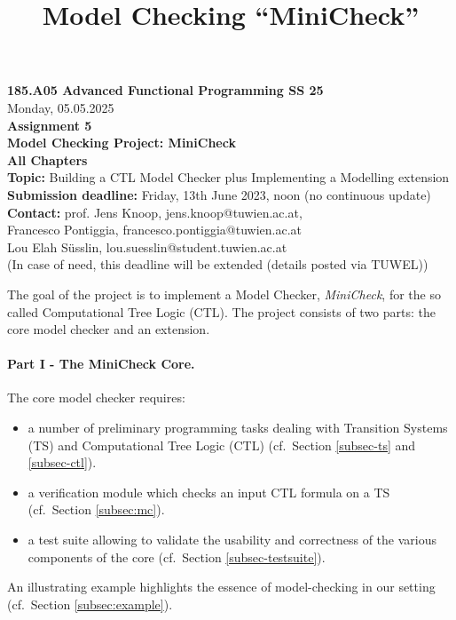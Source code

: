 \documentclass{article}
\title{Model Checking ``MiniCheck''}
\begin{document}
\large
\begin{center}
  {\Large \textbf{185.A05 Advanced Functional Programming SS 25}}  \\ [1ex] 
            Monday, 05.05.2025 \\
               {\Large \textbf{Assignment 5}} \\[.5ex]
              {\Large \textbf{Model Checking Project: MiniCheck}} \\[.5ex]
                 \textbf{All Chapters}  \\ [.75ex]
           \textbf{Topic:} Building a CTL Model Checker plus Implementing a Modelling extension \\[1ex]
          \textbf{Submission deadline:} Friday, 13th June 2023, noon (no continuous update)  \\ [0.5ex]
          \textbf{Contact:} prof. Jens Knoop, jens.knoop@tuwien.ac.at, \\
                            Francesco Pontiggia, francesco.pontiggia@tuwien.ac.at \\
                            Lou Elah Süsslin, lou.suesslin@student.tuwien.ac.at \\
                     (In case of need, this deadline will be extended (details posted via TUWEL))
\end{center}

\vspace{1ex}
\noindent
\noindent

\newcommand{\code}[1]{\texttt{#1}}

\noindent
The goal of the project is to implement a  Model Checker, \textit{MiniCheck}, 
for the so called Computational Tree Logic (CTL). 
The project consists of two parts: the core model checker and an extension. 

\paragraph{Part I - The MiniCheck Core.} The core model checker requires: 
\begin{itemize}
    \item a number of preliminary programming tasks dealing with Transition Systems (TS)
          and Computational Tree Logic (CTL) (cf.~Section \ref{subsec-ts} and \ref{subsec-ctl}).
    \item a verification module which checks an input CTL formula on a TS (cf.~Section \ref{subsec:mc}).
    \item a test suite allowing to validate the usability and correctness of the
          various components of the core (cf.~Section \ref{subsec-testsuite}).
\end{itemize}  
An illustrating example highlights the essence of model-checking in our setting (cf.~Section \ref{subsec:example}). 
\end{document}
